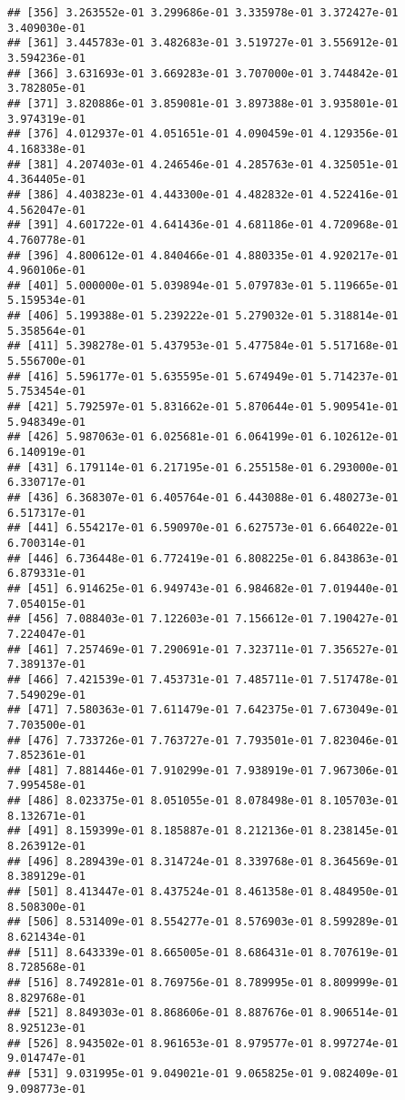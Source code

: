 \documentclass[
]{article}
\begin{document}
\begin{verbatim}
## [356] 3.263552e-01 3.299686e-01 3.335978e-01 3.372427e-01 3.409030e-01
## [361] 3.445783e-01 3.482683e-01 3.519727e-01 3.556912e-01 3.594236e-01
## [366] 3.631693e-01 3.669283e-01 3.707000e-01 3.744842e-01 3.782805e-01
## [371] 3.820886e-01 3.859081e-01 3.897388e-01 3.935801e-01 3.974319e-01
## [376] 4.012937e-01 4.051651e-01 4.090459e-01 4.129356e-01 4.168338e-01
## [381] 4.207403e-01 4.246546e-01 4.285763e-01 4.325051e-01 4.364405e-01
## [386] 4.403823e-01 4.443300e-01 4.482832e-01 4.522416e-01 4.562047e-01
## [391] 4.601722e-01 4.641436e-01 4.681186e-01 4.720968e-01 4.760778e-01
## [396] 4.800612e-01 4.840466e-01 4.880335e-01 4.920217e-01 4.960106e-01
## [401] 5.000000e-01 5.039894e-01 5.079783e-01 5.119665e-01 5.159534e-01
## [406] 5.199388e-01 5.239222e-01 5.279032e-01 5.318814e-01 5.358564e-01
## [411] 5.398278e-01 5.437953e-01 5.477584e-01 5.517168e-01 5.556700e-01
## [416] 5.596177e-01 5.635595e-01 5.674949e-01 5.714237e-01 5.753454e-01
## [421] 5.792597e-01 5.831662e-01 5.870644e-01 5.909541e-01 5.948349e-01
## [426] 5.987063e-01 6.025681e-01 6.064199e-01 6.102612e-01 6.140919e-01
## [431] 6.179114e-01 6.217195e-01 6.255158e-01 6.293000e-01 6.330717e-01
## [436] 6.368307e-01 6.405764e-01 6.443088e-01 6.480273e-01 6.517317e-01
## [441] 6.554217e-01 6.590970e-01 6.627573e-01 6.664022e-01 6.700314e-01
## [446] 6.736448e-01 6.772419e-01 6.808225e-01 6.843863e-01 6.879331e-01
## [451] 6.914625e-01 6.949743e-01 6.984682e-01 7.019440e-01 7.054015e-01
## [456] 7.088403e-01 7.122603e-01 7.156612e-01 7.190427e-01 7.224047e-01
## [461] 7.257469e-01 7.290691e-01 7.323711e-01 7.356527e-01 7.389137e-01
## [466] 7.421539e-01 7.453731e-01 7.485711e-01 7.517478e-01 7.549029e-01
## [471] 7.580363e-01 7.611479e-01 7.642375e-01 7.673049e-01 7.703500e-01
## [476] 7.733726e-01 7.763727e-01 7.793501e-01 7.823046e-01 7.852361e-01
## [481] 7.881446e-01 7.910299e-01 7.938919e-01 7.967306e-01 7.995458e-01
## [486] 8.023375e-01 8.051055e-01 8.078498e-01 8.105703e-01 8.132671e-01
## [491] 8.159399e-01 8.185887e-01 8.212136e-01 8.238145e-01 8.263912e-01
## [496] 8.289439e-01 8.314724e-01 8.339768e-01 8.364569e-01 8.389129e-01
## [501] 8.413447e-01 8.437524e-01 8.461358e-01 8.484950e-01 8.508300e-01
## [506] 8.531409e-01 8.554277e-01 8.576903e-01 8.599289e-01 8.621434e-01
## [511] 8.643339e-01 8.665005e-01 8.686431e-01 8.707619e-01 8.728568e-01
## [516] 8.749281e-01 8.769756e-01 8.789995e-01 8.809999e-01 8.829768e-01
## [521] 8.849303e-01 8.868606e-01 8.887676e-01 8.906514e-01 8.925123e-01
## [526] 8.943502e-01 8.961653e-01 8.979577e-01 8.997274e-01 9.014747e-01
## [531] 9.031995e-01 9.049021e-01 9.065825e-01 9.082409e-01 9.098773e-01

\end{verbatim}
\end{document}

